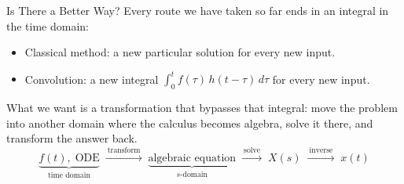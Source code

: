 \documentclass[12pt, aspectratio=169]{beamer}
\begin{document}


\begin{frame}{Is There a Better Way?}
    Every route we have taken so far ends in an \alert{integral in the time domain}:
    \begin{itemize}
        \item Classical method: a new particular solution for every new input.
        \item Convolution: a new integral $\int_0^t f(\tau)\,h(t-\tau)\,d\tau$ for every
              new input.
    \end{itemize}
    \vspace{0.3em}
    What we want is a \alert{transformation that bypasses that integral}: move the
    problem into another domain where the calculus becomes algebra, solve it there, and
    transform the answer back.
    \[
        \underbrace{f(t),\;\text{ODE}}_{\text{time domain}}
        \;\xrightarrow{\ \text{transform}\ }\;
        \underbrace{\text{algebraic equation}}_{s\text{-domain}}
        \;\xrightarrow{\ \text{solve}\ }\; X(s)
        \;\xrightarrow{\ \text{inverse}\ }\; x(t)
    \]
\end{frame}
\end{document}
